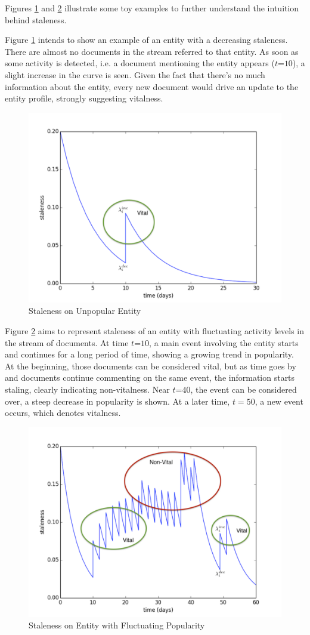\documentclass{article}
\begin{document}
Figures \ref{stalenesslow} and \ref{stalenessmedium} illustrate some toy examples to further understand the intuition behind staleness.

Figure \ref{stalenesslow} intends to show an example of an entity with a decreasing staleness. There are almost no documents in the stream referred to that entity. As soon as some activity is detected, i.e. a document mentioning the entity appears ($t\mathord{=}10$), a slight increase in the curve is seen. Given the fact that there's no much information about the entity, every new document would drive an update to the entity profile, strongly suggesting vitalness.

\begin{figure}[h!]
\centering
\includegraphics[width=.5\textwidth]{staleness1.pdf}
\caption{Staleness on Unpopular Entity}
\label{stalenesslow}
\end{figure}

Figure \ref{stalenessmedium} aims to represent staleness of an entity with fluctuating activity levels in the stream of documents. At time $t\mathord{=}10$, a main event involving the entity starts and continues for a long period of time, showing a growing trend in popularity. 
At the beginning, those documents can be considered vital, but as time goes by and documents continue commenting on the same event, the information starts staling, clearly indicating non-vitalness.
Near $t\mathord{=}40$, the event can be considered over, a steep decrease in popularity is shown. At a later time, $t=50$, a new event occurs, which denotes vitalness.

\begin{figure}[h!]
\centering
\includegraphics[width=.5\textwidth]{staleness2.pdf}
\caption{Staleness on Entity with Fluctuating Popularity}
\label{stalenessmedium}
\end{figure}
\end{document}
